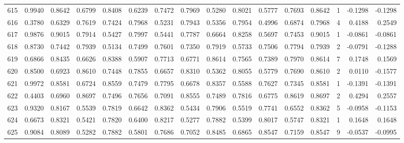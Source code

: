 \begin{tabular}{lrrrrrrrrrrrrrrr}
615 &      0.9940 &  0.8642 &  0.6799 &  0.8408 &  0.6239 &  0.7472 &  0.7969 &  0.5280 &  0.8021 &  0.5777 &   0.7693 &     0.8642 &      1 &                   -0.1298 &                    -0.1298 \\
616 &      0.3780 &  0.6329 &  0.7619 &  0.7424 &  0.7968 &  0.5231 &  0.7943 &  0.5356 &  0.7954 &  0.4996 &   0.6874 &     0.7968 &      4 &                    0.4188 &                     0.2549 \\
617 &      0.9876 &  0.9015 &  0.7914 &  0.5427 &  0.7997 &  0.5441 &  0.7787 &  0.6664 &  0.8258 &  0.5697 &   0.7453 &     0.9015 &      1 &                   -0.0861 &                    -0.0861 \\
618 &      0.8730 &  0.7442 &  0.7939 &  0.5134 &  0.7499 &  0.7601 &  0.7350 &  0.7919 &  0.5733 &  0.7506 &   0.7794 &     0.7939 &      2 &                   -0.0791 &                    -0.1288 \\
619 &      0.6866 &  0.8435 &  0.6626 &  0.8388 &  0.5907 &  0.7713 &  0.6771 &  0.8614 &  0.7565 &  0.7389 &   0.7970 &     0.8614 &      7 &                    0.1748 &                     0.1569 \\
620 &      0.8500 &  0.6923 &  0.8610 &  0.7448 &  0.7855 &  0.6657 &  0.8310 &  0.5362 &  0.8055 &  0.5779 &   0.7690 &     0.8610 &      2 &                    0.0110 &                    -0.1577 \\
621 &      0.9972 &  0.8581 &  0.6724 &  0.8559 &  0.7479 &  0.7795 &  0.6678 &  0.8357 &  0.5588 &  0.7627 &   0.7345 &     0.8581 &      1 &                   -0.1391 &                    -0.1391 \\
622 &      0.4403 &  0.6960 &  0.8697 &  0.7496 &  0.7656 &  0.7091 &  0.8555 &  0.7489 &  0.7816 &  0.6775 &   0.8619 &     0.8697 &      2 &                    0.4294 &                     0.2557 \\
623 &      0.9320 &  0.8167 &  0.5539 &  0.7819 &  0.6642 &  0.8362 &  0.5434 &  0.7906 &  0.5519 &  0.7741 &   0.6552 &     0.8362 &      5 &                   -0.0958 &                    -0.1153 \\
624 &      0.6673 &  0.8321 &  0.5421 &  0.7820 &  0.6400 &  0.8217 &  0.5277 &  0.7882 &  0.5399 &  0.8017 &   0.5747 &     0.8321 &      1 &                    0.1648 &                     0.1648 \\
625 &      0.9084 &  0.8089 &  0.5282 &  0.7882 &  0.5801 &  0.7686 &  0.7052 &  0.8485 &  0.6865 &  0.8547 &   0.7159 &     0.8547 &      9 &                   -0.0537 &                    -0.0995 \\

\end{tabular}
